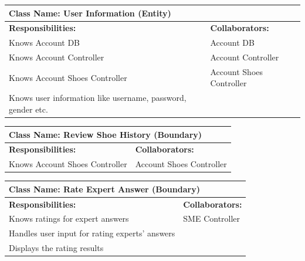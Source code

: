 \documentclass[]{article}
\begin{document}
\begin{table}[H]
    \centering
    \begin{tabular}{|p{}|p{}|}
        \hline
        \multicolumn{2}{|l|}{\textbf{Class Name:} User Information (Entity)} \\
        \hline
        \textbf{Responsibilities:} & \textbf{Collaborators:} \\
        \hline
        Knows Account DB & Account DB \\
        Knows Account Controller & Account Controller \\
        Knows Account Shoes Controller & Account Shoes Controller \\
        Knows user information like username, password, gender etc. & \\ 
        
        \hline
    \end{tabular}
    \label{tab:user_information}
\end{table}

\begin{table}[H]
    \centering
    \begin{tabular}{|p{}|p{}|}
        \hline
        \multicolumn{2}{|l|}{\textbf{Class Name:} Review Shoe History (Boundary)} \\
        \hline
        \textbf{Responsibilities:} & \textbf{Collaborators:} \\
        \hline
        Knows Account Shoes Controller & Account Shoes Controller \\
        \hline
    \end{tabular}
    \label{tab:review_shoe_history}
\end{table}

\begin{table}[H]
    \centering
    \begin{tabular}{|p{}|p{}|}
        \hline
        \multicolumn{2}{|l|}{\textbf{Class Name:} Rate Expert Answer (Boundary)} \\
        \hline
        \textbf{Responsibilities:} & \textbf{Collaborators:} \\
        \hline
        Knows ratings for expert answers & SME Controller \\
        Handles user input for rating experts' answers  &  \\
        Displays the rating results  &  \\
        \hline
    \end{tabular}
    \label{tab:rate_expert_answer}
\end{table}
\end{document}
